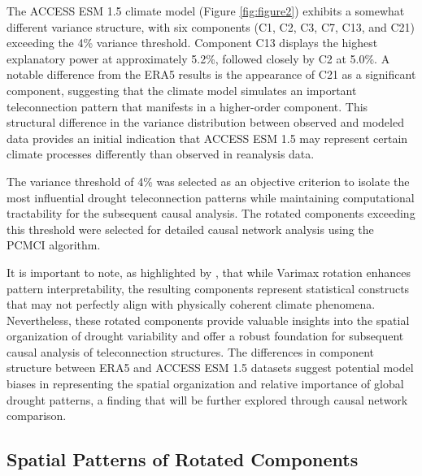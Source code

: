 \documentclass[
]{krantz}
\begin{document}
The ACCESS ESM 1.5 climate model (Figure \ref{fig:figure2}) exhibits a somewhat different variance structure, with six components (C1, C2, C3, C7, C13, and C21) exceeding the 4\% variance threshold. Component C13 displays the highest explanatory power at approximately 5.2\%, followed closely by C2 at 5.0\%. A notable difference from the ERA5 results is the appearance of C21 as a significant component, suggesting that the climate model simulates an important teleconnection pattern that manifests in a higher-order component. This structural difference in the variance distribution between observed and modeled data provides an initial indication that ACCESS ESM 1.5 may represent certain climate processes differently than observed in reanalysis data.

The variance threshold of 4\% was selected as an objective criterion to isolate the most influential drought teleconnection patterns while maintaining computational tractability for the subsequent causal analysis. The rotated components exceeding this threshold were selected for detailed causal network analysis using the PCMCI algorithm.

It is important to note, as highlighted by \citet{hannachi2007}, that while Varimax rotation enhances pattern interpretability, the resulting components represent statistical constructs that may not perfectly align with physically coherent climate phenomena. Nevertheless, these rotated components provide valuable insights into the spatial organization of drought variability and offer a robust foundation for subsequent causal analysis of teleconnection structures. The differences in component structure between ERA5 and ACCESS ESM 1.5 datasets suggest potential model biases in representing the spatial organization and relative importance of global drought patterns, a finding that will be further explored through causal network comparison.

\subsection{Spatial Patterns of Rotated Components}\label{spatial-patterns-of-rotated-components}
\end{document}
